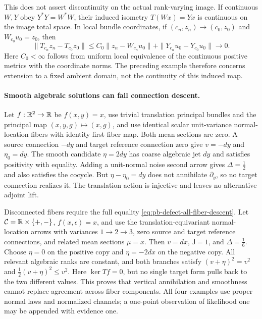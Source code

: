 This does not assert discontinuity on the actual rank-varying image.
If continuous $W,Y$ obey $Y^*Y=W^*W$, their induced isometry
$T(Wx)=Yx$ is continuous on the image total space. In local bundle
coordinates, if $(c_n,z_n)\to(c_0,z_0)$ and $W_{c_0}u_0=z_0$, then
\begin{equation}
\|T_{c_n}z_n-T_{c_0}z_0\|
\leq C_0\|z_n-W_{c_n}u_0\|
     +\|Y_{c_n}u_0-Y_{c_0}u_0\|\longrightarrow0.
\label{eq:pb-defect-image-continuity}
\end{equation}
Here $C_0<\infty$ follows from uniform local equivalence of the
continuous positive metrics with the coordinate norms. The preceding example
therefore concerns extension to a fixed ambient domain, not the
continuity of this induced map. 

\paragraph{Smooth algebraic solutions can fail connection descent.}
Let $f:\mathbb R^2\to\mathbb R$ be $f(x,y)=x$, use trivial translation principal
bundles and the principal map $(x,y,g)\mapsto(x,g)$, and use identical
scalar unit-variance normal-location fibers with identity first
fiber map. Both mean sections are zero. A source connection $-dy$
and target reference connection zero give $v=-dy$ and $\eta_0=dy$.
The smooth candidate $\eta=2dy$ has coarse algebraic jet $dy$ and
satisfies positivity with equality. Adding a unit-normal noise
second arrow gives $\Delta=\tfrac12$ and also satisfies the cocycle.
But $\eta-\eta_0=dy$ does not annihilate $\partial_y$, so no target
connection realizes it. The translation action is injective and
leaves no alternative adjoint lift. 

Disconnected fibers require the full equality
\eqref{eq:pb-defect-all-fiber-descent}. Let
$\mathcal C=\mathbb R\times\{+,-\}$, $f(x,\epsilon)=x$, and use the
translation-equivariant normal-location arrows with variances
$1\to2\to3$, zero source and target reference connections, and
related mean sections $\mu=x$. Then $v=dx$, $\mathsf J=1$, and
$\Delta=\tfrac16$. Choose $\eta=0$ on the positive copy and
$\eta=-2dx$ on the negative copy. All relevant algebraic ranks are
constant, and both branches satisfy
$(v+\eta)^2=v^2$ and $\tfrac12(v+\eta)^2\leq v^2$.
Here $\ker Tf=0$, but no single target form pulls back to the two
different values. This proves that vertical annihilation and
smoothness cannot replace agreement across fiber components.
All four examples use proper normal laws and normalized channels;
a one-point observation of likelihood one may be appended with
evidence one. 

